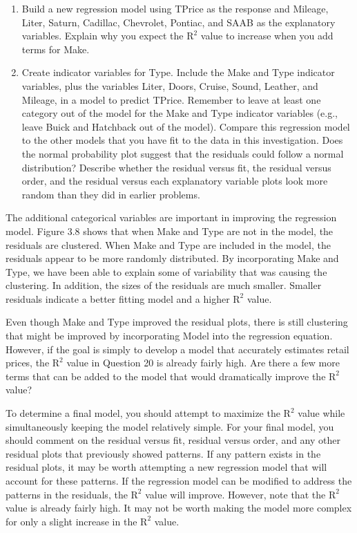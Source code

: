 \documentclass[
]{book}
\begin{document}
\begin{enumerate}
\def\labelenumi{\arabic{enumi}.}
\setcounter{enumi}{18}
\item
  Build a new regression model using TPrice as the response and Mileage, Liter, Saturn, Cadillac, Chevrolet, Pontiac, and SAAB as the explanatory variables. Explain why you expect the \(\mathrm{R}^2\) value to increase when you add terms for Make.
\item
  Create indicator variables for Type. Include the Make and Type indicator variables, plus the variables Liter, Doors, Cruise, Sound, Leather, and Mileage, in a model to predict TPrice. Remember to leave at least one category out of the model for the Make and Type indicator variables (e.g., leave Buick and Hatchback out of the model). Compare this regression model to the other models that you have fit to the data in this investigation. Does the normal probability plot suggest that the residuals could follow a normal distribution? Describe whether the residual versus fit, the residual versus order, and the residual versus each explanatory variable plots look more random than they did in earlier problems.
\end{enumerate}

The additional categorical variables are important in improving the regression model. Figure 3.8 shows that when Make and Type are not in the model, the residuals are clustered. When Make and Type are included in the model, the residuals appear to be more randomly distributed. By incorporating Make and Type, we have been able to explain some of variability that was causing the clustering. In addition, the sizes of the residuals are much smaller. Smaller residuals indicate a better fitting model and a higher \(\mathrm{R}^2\) value.

Even though Make and Type improved the residual plots, there is still clustering that might be improved by incorporating Model into the regression equation. However, if the goal is simply to develop a model that accurately estimates retail prices, the \(\mathrm{R}^2\) value in Question 20 is already fairly high. Are there a few more terms that can be added to the model that would dramatically improve the \(\mathrm{R}^2\) value?

To determine a final model, you should attempt to maximize the \(\mathrm{R}^2\) value while simultaneously keeping the model relatively simple. For your final model, you should comment on the residual versus fit, residual versus order, and any other residual plots that previously showed patterns. If any pattern exists in the residual plots, it may be worth attempting a new regression model that will account for these patterns. If the regression model can be modified to address the patterns in the residuals, the \(\mathrm{R}^2\) value will improve. However, note that the \(\mathrm{R}^2\) value is already fairly high. It may not be worth making the model more complex for only a slight increase in the \(\mathrm{R}^2\) value.
\end{document}
